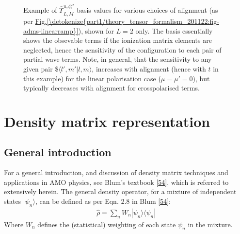 \documentclass[letterpaper,table,10pt,english]{jupyterBook}
\begin{document}
\begin{figure}[htbp]
\centering
\capstart

\noindent{}
\caption{Example of \(\bar{\varUpsilon_{}}_{L,M}^{u,\zeta\zeta'}\) basis values for various choices of alignment (as per \hyperref[\detokenize{part1/theory_tensor_formalism_201122:fig-adms-linearramp}]{Fig.\@ \ref{\detokenize{part1/theory_tensor_formalism_201122:fig-adms-linearramp}}}), shown for \(L=2\) only. The basis essentially shows the obsevable terms if the ionization matrix elements are neglected, hence the sensitivity of the configuration to each pair of partial wave terms. Note, in general, that the sensitivity to any given pair \$\(\langle l',m'|l,m\rangle\), increases with alignment (hence with \(t\) in this example) for the linear polarisation case (\(\mu=\mu'=0\)), but typically decreases with alignment for cross\sphinxhyphen{}polarised terms.}\label{\detokenize{part1/theory_tensor_formalism_201122:fig-channelfunc-linearramp}}\end{figure}

\sphinxstepscope


\section{Density matrix representation}
\label{\detokenize{part1/theory_density_matrices_310123:density-matrix-representation}}\label{\detokenize{part1/theory_density_matrices_310123:sec-density-mat-basic}}\label{\detokenize{part1/theory_density_matrices_310123::doc}}

\subsection{General introduction}
\label{\detokenize{part1/theory_density_matrices_310123:general-introduction}}\label{\detokenize{part1/theory_density_matrices_310123:sec-density-mat-intro}}
\sphinxAtStartPar
For a general introduction, and discussion of density matrix techniques and applications in AMO physics, see Blum’s textbook  {[}\hyperlink{cite.backmatter/bibliography:id479}{54}{]}, which is referred to extensively herein. The general density operator, for a mixture of independent states \(|\psi_{n}\rangle\), can be defined as per Eqn. 2.8 in Blum {[}\hyperlink{cite.backmatter/bibliography:id479}{54}{]}:
\begin{equation*}
\begin{split}
\hat{\rho}=\sum_{n}W_{n}|\psi_{n}\rangle\langle\psi_{n}|
\end{split}
\end{equation*}
\sphinxAtStartPar
Where \(W_{n}\) defines the (statistical) weighting of each state \(\psi_{n}\) in the mixture.
\end{document}
